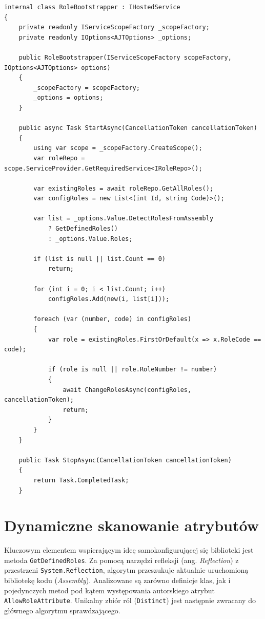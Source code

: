 \documentclass{SGGW-thesis}
\begin{document}
\begin{minipage}{\textwidth}
\begin{lstlisting}  
internal class RoleBootstrapper : IHostedService
{
    private readonly IServiceScopeFactory _scopeFactory;
    private readonly IOptions<AJTOptions> _options;

    public RoleBootstrapper(IServiceScopeFactory scopeFactory, IOptions<AJTOptions> options)
    {
        _scopeFactory = scopeFactory;
        _options = options;
    }

    public async Task StartAsync(CancellationToken cancellationToken)
    {
        using var scope = _scopeFactory.CreateScope();
        var roleRepo = scope.ServiceProvider.GetRequiredService<IRoleRepo>();

        var existingRoles = await roleRepo.GetAllRoles();
        var configRoles = new List<(int Id, string Code)>();

        var list = _options.Value.DetectRolesFromAssembly
            ? GetDefinedRoles()
            : _options.Value.Roles;

        if (list is null || list.Count == 0)
            return;
        
        for (int i = 0; i < list.Count; i++)
            configRoles.Add(new(i, list[i]));

        foreach (var (number, code) in configRoles)
        {
            var role = existingRoles.FirstOrDefault(x => x.RoleCode == code);

            if (role is null || role.RoleNumber != number)
            {
                await ChangeRolesAsync(configRoles, cancellationToken);
                return;
            }
        }
    }

    public Task StopAsync(CancellationToken cancellationToken)
    {
        return Task.CompletedTask;
    }
\end{lstlisting}
\end{minipage}

\clearpage

\section{Dynamiczne skanowanie atrybutów}

Kluczowym elementem wspierającym ideę samokonfigurującej się biblioteki jest metoda \texttt{GetDefinedRoles}. Za pomocą narzędzi refleksji (ang. \textit{Reflection}) z przestrzeni \texttt{System.Reflection}, algorytm przeszukuje aktualnie uruchomioną bibliotekę kodu (\textit{Assembly}). Analizowane są zarówno definicje klas, jak i pojedynczych metod pod kątem występowania autorskiego atrybut \texttt{AllowRoleAttribute}. Unikalny zbiór ról (\texttt{Distinct}) jest następnie zwracany do głównego algorytmu sprawdzającego.
\end{document}
